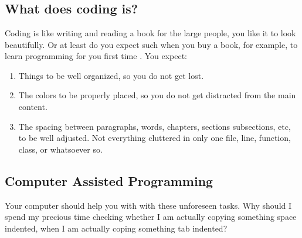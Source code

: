 

%


\chapter{}


    \section{What does coding is?}

    Coding is like writing and reading a book for the large people, you like it
    to look beautifully. Or at least do you expect such when you buy a book, for
    example, to learn programming for you first time \cite{howNovicesRead}.
    You expect:

    \begin{enumerate}
        \item Things to be well organized,
              so you do not get lost.
        \item The colors to be properly placed,
              so you do not get distracted from the main content.
        \item The spacing between paragraphs, words, chapters, sections
              subsections, etc, to be well adjusted.
              Not everything cluttered in only one file,
              line, function, class, or whatsoever so.
    \end{enumerate}



    \section{Computer Assisted Programming}

    Your computer should help you with with these unforeseen tasks.
    Why should I spend my precious time checking whether I am actually copying
    something space indented,
    when I am actually coping something tab indented?

